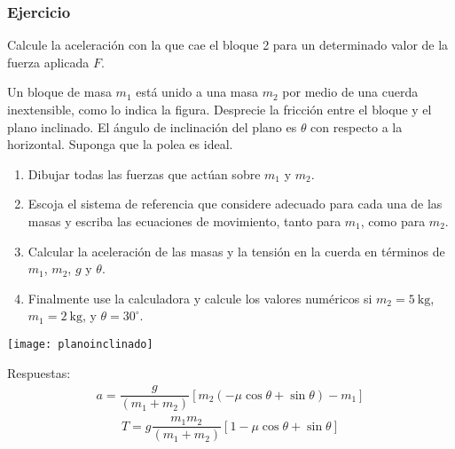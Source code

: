 \subsubsection*{Ejercicio}
Calcule la aceleración con la que cae el bloque 2 para un determinado valor de la fuerza aplicada $F$.

\ejercicio{}
Un bloque de masa $m_{1}$ está unido a una masa $m_{2}$ por medio de una cuerda inextensible, como lo indica la figura. Desprecie la fricción entre el bloque y el plano inclinado. El ángulo de inclinación del plano es $\theta$ con respecto a la horizontal. Suponga que la polea es ideal.

\begin{minipage}{12 cm}{
\begin{enumerate}
\item Dibujar todas las fuerzas que actúan sobre $m_{1}$ y $m_{2}$.
\item Escoja el sistema de referencia que considere adecuado para cada una de las masas y 
escriba  las   ecuaciones   de movimiento, tanto para $m_{1}$, como  para $m_{2}$.
\item Calcular la aceleración de las masas y la tensión en la cuerda en términos de $m_{1}$, $m_{2}$, $g$ y $\theta$.

\item Finalmente use la calculadora y calcule los valores numéricos si $m_{2}=\SI{5}{\kilo\gram}$, $m_{1}=\SI{2}{\kilo\gram}$, y $\theta=30^\circ$. 
\end{enumerate}
}\end{minipage}
\begin{minipage}{6 cm}{
\begin{center}
\texttt{[image: planoinclinado]}
\end{center}
}\end{minipage}


  Respuestas:
  \begin{align*}
    a=\dfrac{g}{(m_{1}+m_{2})}[m_{2}(-\mu \cos\theta +\sin\theta) - m_{1}]
  \end{align*}   
 \begin{align*}
   T=g\dfrac{m_{1}m_{2}}{(m_{1}+m_{2})}[1-\mu\cos\theta + \sin\theta]
\end{align*}





